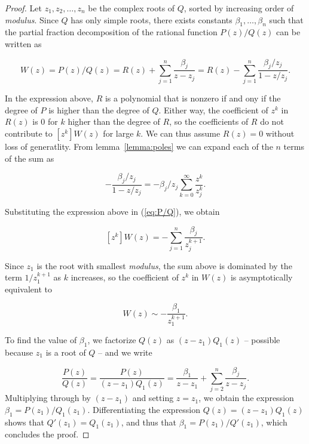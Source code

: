 \documentclass{article}
\begin{document}
\begin{proof}
Let $z_1, z_2, \ldots, z_n$ be the complex roots of $Q$, sorted by
increasing order of \textit{modulus}. Since $Q$ has only simple roots,
there exists constants $\beta_1, \ldots, \beta_n$ such that the partial
fraction decomposition of the rational function $P(z)/Q(z)$ can be written
as

\begin{equation}
\label{eq:P/Q}
W(z) = P(z)/Q(z) = R(z) + \sum_{j=1}^n \frac{\beta_j}{z-z_j} =
R(z) -\sum_{j=1}^n \frac{\beta_j/z_j}{1-z/z_j}.
\end{equation}

In the expression above, $R$ is a polynomial that is nonzero if and ony if
the degree of $P$ is higher than the degree of $Q$. Either way, the
coefficient of $z^k$ in $R(z)$ is $0$ for $k$ higher than the degree of
$R$, so the coefficients of $R$ do not contribute to $[z^k]W(z)$ for
large $k$. We can thus assume $R(z) = 0$ without loss of generatlity. From
lemma~\ref{lemma:poles} we can expand each of the $n$ terms of the sum as

\begin{equation*}
-\frac{\beta_j/z_j}{1-z/z_j} = -\beta_j/z_j
\sum_{k=0}^\infty \frac{z^k}{z_j^k}.
\end{equation*}


Substituting the expression above in (\ref{eq:P/Q}), we obtain

\begin{equation}
\label{eq:fullass}
[z^k]W(z) = -\sum_{j=1}^n \frac{\beta_j}{z_j^{k+1}}.
\end{equation}

Since $z_1$ is the root with smallest \textit{modulus}, the sum above is
dominated by the term $1/z_1^{k+1}$ as $k$ increases, so the coefficient
of $z^k$ in $W(z)$ is asymptotically equivalent to

\begin{equation*}
[z^k]W(z) \sim -\frac{\beta_1}{z_1^{k+1}}.
\end{equation*}

To find the value of $\beta_1$, we factorize $Q(z)$ as
$(z-z_1)Q_1(z)$ -- possible because $z_1$ is a root of $Q$ --
and we write

\begin{equation*}
\frac{P(z)}{Q(z)} =
\frac{P(z)}{(z-z_1)Q_1(z)} = \frac{\beta_1}{z-z_1} +
\sum_{j=2}^n\frac{\beta_j}{z-z_j}.
\end{equation*}
Multiplying through by $(z-z_1)$ and setting $z = z_1$, we obtain the
expression $\beta_1 = P(z_1) / Q_1(z_1)$. Differentiating the expression
$Q(z) = (z-z_1)Q_1(z)$ shows that $Q'(z_1) = Q_1(z_1)$, and thus that
$\beta_1 = P(z_1) / Q'(z_1)$, which concludes the proof.
\end{proof}
\end{document}
